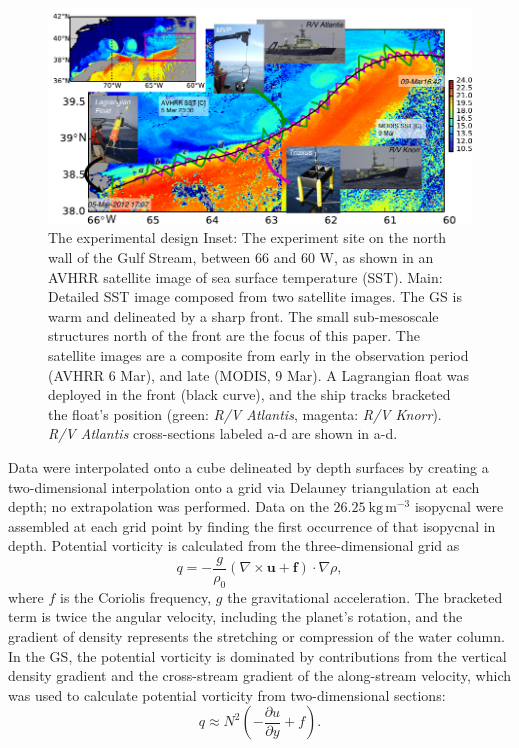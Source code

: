 \documentclass[draft,grl]{agutex2015}
\begin{document}
\begin{article}
\begin{figure}[htbp]
  \centering
    \includegraphics[width=\textwidth]{./SatOverviewSecDTry2.pdf}
   \caption{ The experimental design  Inset: The experiment site on the north wall of the Gulf Stream, between 66 and 60 W, as shown in an AVHRR satellite image of sea surface temperature (SST).  Main:  Detailed SST image composed from two satellite images.    The GS is warm and delineated by a sharp front.  The small sub-mesoscale structures north of the front are the focus of this paper.  The satellite images are a composite from early in the observation period (AVHRR 6 Mar), and late (MODIS, 9 Mar).  A Lagrangian float was deployed in the front (black curve), and the ship tracks bracketed the float's position (green: \emph{R/V Atlantis}, magenta: \emph{R/V Knorr}). \emph{R/V Atlantis} cross-sections labeled a-d are shown in a-d.  }\label{fig:SatOverviewSectD}
\end{figure}

Data were interpolated onto a cube delineated by depth surfaces by creating a two-dimensional interpolation onto a grid via Delauney triangulation at each depth; no extrapolation was performed.  Data on the $26.25\ \mathrm{kg\,m^{-3}}$ isopycnal were assembled at each grid point by finding the first occurrence of that isopycnal in depth.  
Potential vorticity is calculated from the three-dimensional grid as
\begin{equation}
  q = -\frac{g}{\rho_0}\left(\nabla \times\mathbf{u}+\mathbf{f}\right) \cdot \nabla\rho,
\end{equation}
where $f$ is the Coriolis frequency, $g$ the gravitational acceleration. The bracketed term is twice the angular velocity, including the planet's rotation, and the gradient of density represents the stretching or compression of the water column.  In the GS, the potential vorticity is dominated by contributions from the vertical density gradient and the cross-stream gradient of the along-stream velocity, which was used to calculate potential vorticity from two-dimensional sections:
\begin{equation}
  q \approx N^2\left(-\frac{\partial u}{\partial y}+f\right).
\end{equation}


\end{article}
\end{document}
